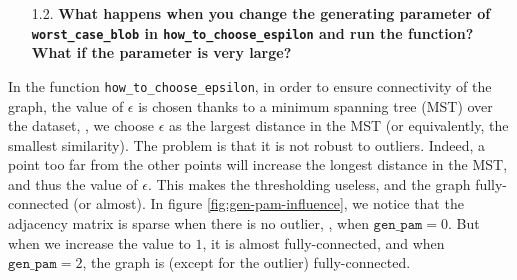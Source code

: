 \documentclass[a4paper, 11pt]{report}
\begin{document}
\begin{itemize}
    \item[1.2.] \textbf{What happens when you change the generating parameter of \texttt{worst\_case\_blob} in \linebreak
    \texttt{how\_to\_choose\_espilon} and run the function? What if the parameter is very large?}
\end{itemize}
    
    In the function \texttt{how\_to\_choose\_epsilon}, in order to ensure connectivity of the graph, the value of $\epsilon$ is chosen thanks to a minimum spanning tree (MST) over the dataset, \ie, we choose $\epsilon$ as the largest distance in the MST (or equivalently, the smallest similarity). The problem is that it is not robust to outliers. Indeed, a point too far from the other points will increase the longest distance in the MST, and thus the value of $\epsilon$. This makes the thresholding useless, and the graph fully-connected (or almost). In figure \ref{fig:gen-pam-influence}, we notice that the adjacency matrix is sparse when there is no outlier, \ie, when $\texttt{gen\_pam} = 0$. But when we increase the value to $1$, it is almost fully-connected, and when $\texttt{gen\_pam} = 2$, the graph is (except for the outlier) fully-connected.
    
\end{document}
